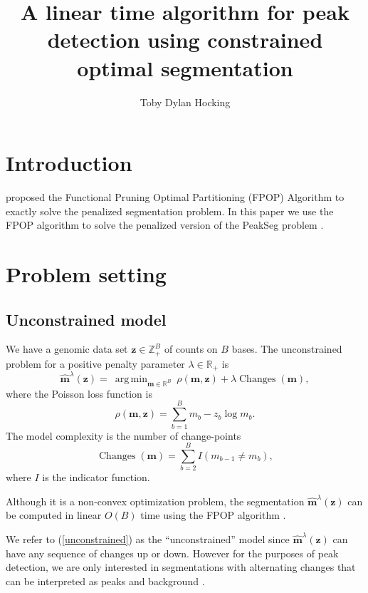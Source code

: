 \documentclass{article}
\DeclareMathOperator*{\argmin}{arg\,min}
\DeclareMathOperator*{\Changes}{Changes}
\newcommand{\ZZ}{\mathbb Z}
\newcommand{\RR}{\mathbb R}
\begin{document}
\title{A linear time algorithm for peak detection using constrained
  optimal segmentation}

\author{Toby Dylan Hocking}

\maketitle

\section{Introduction}

\citet{FPOP} proposed the Functional Pruning Optimal Partitioning
(FPOP) Algorithm to exactly solve the penalized segmentation
problem. In this paper we use the FPOP algorithm to solve the
penalized version of the PeakSeg problem \citep{PeakSeg}.

\section{Problem setting}

\subsection{Unconstrained model}

We have a genomic data set $\mathbf{z}\in\ZZ_+^B$ of counts on $B$
bases. The unconstrained problem for a positive penalty parameter
$\lambda\in\RR_+$ is
\begin{equation}
  \label{unconstrained}
  \mathbf{\hat m}^\lambda(\mathbf z)  =\ 
  \argmin_{\mathbf m\in\RR^{B}}\ 
  \rho
  (\mathbf m, \mathbf z) 
  +\lambda\Changes(\mathbf m),
\end{equation}
where the Poisson loss function is
\begin{equation}\label{eq:rho}
  \rho(\mathbf m, \mathbf z)= \sum_{b=1}^B m_b - z_b \log m_b.
\end{equation} 
The model complexity is the number of change-points
\begin{equation}
  \Changes(\mathbf m)=\sum_{b=2}^B I(m_{b-1} \neq m_b),
\end{equation}
where $I$ is the indicator function.

Although it is a non-convex optimization problem, the segmentation
$\mathbf{\hat m}^\lambda(\mathbf z)$ can be computed in linear $O(B)$
time using the FPOP algorithm \citep{FPOP}.

We refer to (\ref{unconstrained}) as the ``unconstrained'' model since
$\mathbf{\hat m}^\lambda(\mathbf z)$ can have any sequence of changes
up or down. However for the purposes of peak detection, we are only
interested in segmentations with alternating changes that can be
interpreted as peaks and background \citep{PeakSeg}.
\end{document}
